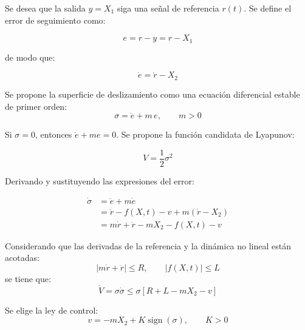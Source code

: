 \begin{enumerate}
\begin{itemize}
        Se desea que la salida $y=X_1$ siga una señal de referencia $r(t)$. Se define el error de seguimiento como:

        \begin{equation*}
            e = r-y = r-X_1
        \end{equation*}

        de modo que:

        \begin{equation*}
            \dot{e}=\dot{r}-X_2
        \end{equation*}

        Se propone la superficie de deslizamiento como una ecuación diferencial estable de primer orden:
        \begin{equation*}
            \sigma=\dot{e}+m\,e,\qquad m>0
        \end{equation*}

        Si $\sigma=0$, entonces $\dot{e}+m e=0$. Se propone la función candidata de Lyapunov:

        \begin{equation*}
            V=\frac{1}{2}\sigma^2
        \end{equation*}

        Derivando y sustituyendo las expresiones del error:

        \begin{equation*}
            \begin{aligned}
                \dot{\sigma} &= \ddot{e}+m\dot{e} \\
                &= \ddot{r}-f(X,t)-v+m(\dot{r}-X_2) \\
                &= m\dot{r}+\ddot{r}-mX_2-f(X,t)-v
            \end{aligned}
        \end{equation*}

        Considerando que las derivadas de la referencia y la dinámica no lineal están acotadas:
        \begin{equation*}
            |m\dot{r}+\ddot{r}|\le R,\qquad |f(X,t)|\le L
        \end{equation*}
        se tiene que:
        \begin{equation*}
            \dot{V}=\sigma\dot{\sigma}\le\sigma\left[R+L-mX_2-v\right]
        \end{equation*}

        Se elige la ley de control:
        \begin{equation*}
            v=-mX_2+K\operatorname{sign}(\sigma),\qquad K>0
        \end{equation*}


\end{itemize}
\end{enumerate}
